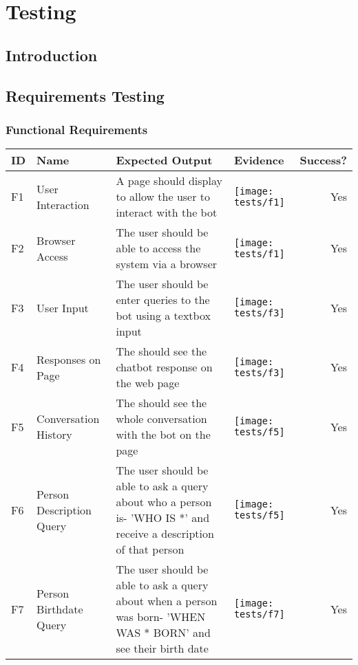 \chapter{Testing}
\label{ch:testing}
\section{Introduction}
\newpage

\begin{landscape}
	\section{Requirements Testing}
	\subsection{Functional Requirements}
	\begin{tabularx}{\hsize}{lXXXr}
		\toprule
		ID & Name & Expected Output & Evidence & Success? \\
		\midrule
		F1 & User Interaction 
		& A page should display to allow the user to interact with the bot
		& \texttt{[image: tests/f1]} & Yes \\
		\midrule
		F2 & Browser Access
		& The user should be able to access the system via a browser
		& \texttt{[image: tests/f1]} & Yes \\
		\midrule
		F3 & User Input
		& The user should be enter queries to the bot using a textbox input
		& \texttt{[image: tests/f3]} & Yes \\
		\midrule
		F4 & Responses on Page
		& The should see the chatbot response on the web page
		& \texttt{[image: tests/f3]} & Yes \\
		\midrule
		F5 & Conversation History
		& The should see the whole conversation with the bot on the page
		& \texttt{[image: tests/f5]} & Yes \\
		\midrule
		F6 & Person Description Query
		& The user should be able to ask a query about who a person is\newline - 'WHO IS *' and receive a description of that person
		& \texttt{[image: tests/f5]} & Yes \\
		\midrule
		F7 & Person Birthdate Query
		& The user should be able to ask a query about when a person was born\newline - 'WHEN WAS * BORN' and see their birth date
		& \texttt{[image: tests/f7]} & Yes \\

\end{tabularx}
\end{landscape}
